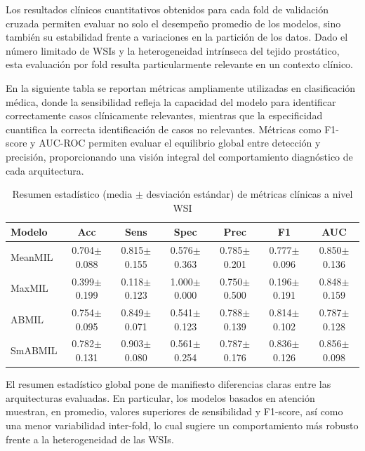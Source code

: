Los resultados clínicos cuantitativos obtenidos para cada fold de validación cruzada permiten evaluar no solo el desempeño promedio de los modelos, sino también su estabilidad frente a variaciones en la partición de los datos. Dado el número limitado de WSIs y la heterogeneidad intrínseca del tejido prostático, esta evaluación por fold resulta particularmente relevante en un contexto clínico.\newline

En la siguiente tabla se reportan métricas ampliamente utilizadas en clasificación médica, donde la sensibilidad refleja la capacidad del modelo para identificar correctamente casos clínicamente relevantes, mientras que la especificidad cuantifica la correcta identificación de casos no relevantes. Métricas como F1-score y AUC-ROC permiten evaluar el equilibrio global entre detección y precisión, proporcionando una visión integral del comportamiento diagnóstico de cada arquitectura.\newline


\begin{table}[h!]
    \centering
    \caption{Resumen estadístico (media $\pm$ desviación estándar) de métricas clínicas a nivel WSI}
    \begin{tabular}{|l|c|c|c|c|c|c|}
        \hline
        \textbf{Modelo} & \textbf{Acc} & \textbf{Sens} & \textbf{Spec} & \textbf{Prec} & \textbf{F1} & \textbf{AUC} \\
        \hline
        MeanMIL & 0.704$\pm$0.088 & 0.815$\pm$0.155 & 0.576$\pm$0.363 & 0.785$\pm$0.201 & 0.777$\pm$0.096 & 0.850$\pm$0.136 \\
        MaxMIL  & 0.399$\pm$0.199 & 0.118$\pm$0.123 & 1.000$\pm$0.000 & 0.750$\pm$0.500 & 0.196$\pm$0.191 & 0.848$\pm$0.159 \\
        ABMIL   & 0.754$\pm$0.095 & 0.849$\pm$0.071 & 0.541$\pm$0.123 & 0.788$\pm$0.139 & 0.814$\pm$0.102 & 0.787$\pm$0.128 \\
        SmABMIL & 0.782$\pm$0.131 & 0.903$\pm$0.080 & 0.561$\pm$0.254 & 0.787$\pm$0.176 & 0.836$\pm$0.126 & 0.856$\pm$0.098 \\
        \hline
    \end{tabular}
\end{table}

El resumen estadístico global pone de manifiesto diferencias claras entre las arquitecturas evaluadas. En particular, los modelos basados en atención muestran, en promedio, valores superiores de sensibilidad y F1-score, así como una menor variabilidad inter-fold, lo cual sugiere un comportamiento más robusto frente a la heterogeneidad de las WSIs.\newline

